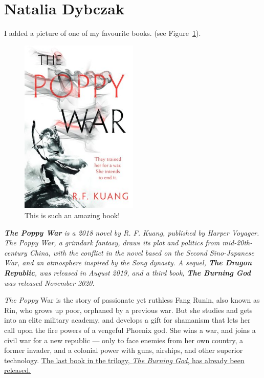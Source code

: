 \section{Natalia Dybczak}
\label{sec:nataliadybczak}

I added a picture of one of my favourite books. (see Figure~\ref{fig:book}).

\begin{figure}[h]
    \centering
    \includegraphics[width=0.5\textwidth]{pictures/pic_nataliadybczak.jpg}
    \caption{This is such an amazing book!}
    \label{fig:book}
\end{figure}

\textit{\textbf{The Poppy War} is a 2018 novel by R. F. Kuang, published by Harper Voyager. The Poppy War, a grimdark fantasy, draws its plot and politics from mid-20th-century China, with the conflict in the novel based on the Second Sino-Japanese War, and an atmosphere inspired by the Song dynasty. A sequel, \textbf{The Dragon Republic}, was released in August 2019, and a third book, \textbf{The Burning God} was released November 2020.}

\textit{The Poppy} War is the story of passionate yet ruthless Fang Runin, also known as Rin, who grows up poor, orphaned by a previous war. But she studies and gets into an elite military academy, and develops a gift for shamanism that lets her call upon the fire powers of a vengeful Phoenix god. She wins a war, and joins a civil war for a new republic — only to face enemies from her own country, a former invader, and a colonial power with guns, airships, and other superior technology. \underline{The last book in the trilogy, \textit{The Burning God}, has already been released.} \\


